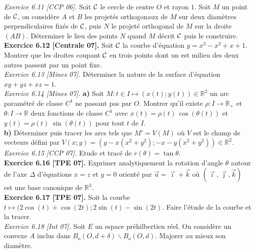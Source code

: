 \documentclass[a4paper,12pt,francais]{article}
\newcommand{\field}[1]{\mathbb{#1}}
\newcommand{\R}{\field{R}}
\begin{document}
\noindent
{\it Exercice 6.11 [CCP 06].} Soit $\cal{C}$ le cercle de centre $O$ et rayon $1$. Soit $M$ un point de $\cal{C}$, on considère $A$ et $B$ les projetés orthogonaux de $M$ sur deux diamètres perpendiculaires fixés de $\cal{C}$, puis $N$ le projeté orthogonal de $M$ sur la droite $(AB)$. Déterminer le lieu des points $N$ quand $M$ décrit $\cal{C}$ puis le construire.\\

\noindent
{\bf Exercice 6.12 [Centrale 07].} Soit $\cal{C}$ la courbe d'équation $y=x^3-x^2+x+1$. Montrer que les droites coupant $\cal{C}$ en trois points dont un est milieu des deux autres passent par un point fixe.\\

\noindent
{\it Exercice 6.13 [Mines 07].} Déterminer la nature de la surface d'équation $xy+yz+xz=1$.\\

\noindent
{\it Exercice 6.14 [Mines 07].} {\bf a)} Soit $M:t \in I \mapsto (x(t);y(t))\in \R^2$ un arc paramétré de classe $C^1$ ne passant pas par $O$. Montrer qu'il existe $\rho :I \to \R_+$ et $\theta : I \to \R$ deux fonctions de classe $C^1$ avec $x(t)=\rho(t)\, \cos(\theta(t))$ et $y(t)=\rho(t) \; \sin (\theta(t))$ pour tout $t$ de $I$.\\
{\bf b)} Déterminer puis tracer les arcs tels que $M'=V(M)$ où $V$ est le champ de vecteurs défini par $V(x;y)=(y-x(x^2+y^2); -x -y(x^2+y^2))\in \R^2$.\\

\noindent
{\it Exercice 6.15 [CCP 07].} Etude et tracé de $r(\theta)=\tan \theta$.\\

\noindent
{\bf Exercice 6.16 [TPE 07].} Exprimer analytiquement la rotation d'angle $\theta$ autour de l'axe $\Delta$ d'équations $x=z$ et $y=0$ orienté par $\vec{u}=\vec{\imath}+\vec{k}$ où $(\vec{\imath},\vec{\jmath},\vec{k})$ est une base canonique de $\R^3$.\\

\noindent
{\bf Exercice 6.17 [TPE 07].} Soit la courbe $t \mapsto (2 \cos(t)+\cos(2t);2\sin (t)- \sin (2t)$. 
Faire l'étude de la courbe et la tracer.\\

\noindent
{\it Exercice 6.18 [Int 07].} Soit $E$ un espace préhilbertien réel. On considère un convexe $A$ inclus dans $B_o(O,d+\delta) \backslash B_o(O,d)$. Majorer au mieux son diamètre.\\
\end{document}
